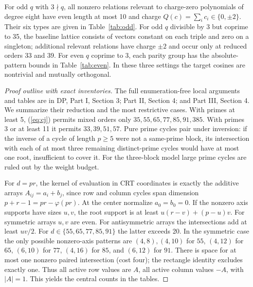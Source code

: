 \documentclass[11pt]{article}
\begin{document}
\begin{lemma}\label{lem:inventory}
For odd $q$ with $3\nmid q$, all nonzero relations relevant to charge-zero polynomials of degree eight have even length at most 10 and charge $Q(c)=\sum_i c_i\in\{0,\pm2\}$. Their six types are given in Table~\ref{tab:odd}. For odd $q$ divisible by 3 but coprime to 35, the baseline lattice consists of vectors constant on each triple and zero on a singleton; additional relevant relations have charge $\pm2$ and occur only at reduced orders 33 and 39. For even $q$ coprime to 3, each parity group has the absolute-pattern bounds in Table~\ref{tab:even}. In these three settings the target cosines are nontrivial and mutually orthogonal.
\end{lemma}
\begin{proof}[Proof outline with exact inventories]
The full enumeration-free local arguments and tables are in DP, Part I, Section 3; Part II, Section 4; and Part III, Section 4. We summarize their reduction and the most restrictive cases. With primes at least 5, (\ref{eq:cj}) permits mixed orders only $35,55,65,77,85,91,385$. With primes 3 or at least 11 it permits $33,39,51,57$. Pure prime cycles pair under inversion: if the inverse of a cycle of length $p\ge5$ were not a same-prime block, its intersection with each of at most three remaining distinct-prime cycles would have at most one root, insufficient to cover it. For the three-block model large prime cycles are ruled out by the weight budget.

For $d=pr$, the kernel of evaluation in CRT coordinates is exactly the additive arrays $A_{ij}=a_i+b_j$, since row and column cycles span dimension $p+r-1=pr-\varphi(pr)$. At the center normalize $a_0=b_0=0$. If the nonzero axis supports have sizes $u,v$, the root support is at least $u(r-v)+(p-u)v$. For symmetric arrays $u,v$ are even. For antisymmetric arrays the intersections add at least $uv/2$. For $d\in\{55,65,77,85,91\}$ the latter exceeds 20. In the symmetric case the only possible nonzero-axis patterns are $(4,8),(4,10)$ for $55$, $(4,12)$ for $65$, $(6,10)$ for $77$, $(4,16)$ for $85$, and $(6,12)$ for $91$. There is space for at most one nonzero paired intersection (cost four); the rectangle identity excludes exactly one. Thus all active row values are $A$, all active column values $-A$, with $|A|=1$. This yields the central counts in the tables.


\end{proof}
\end{document}
